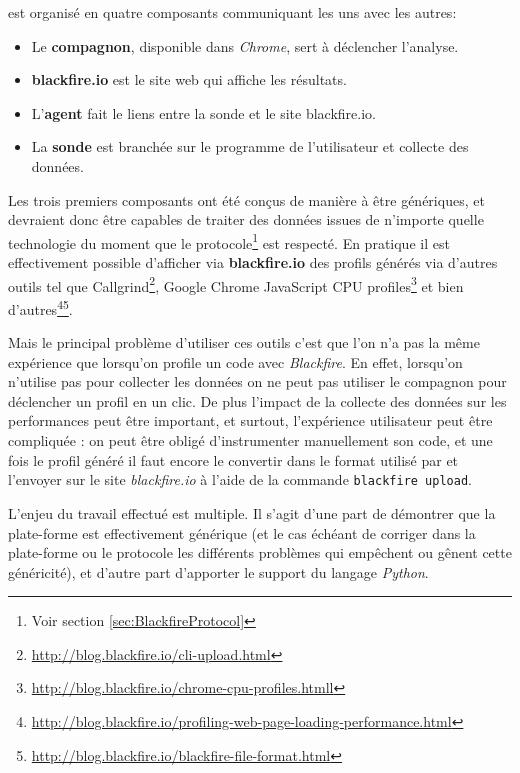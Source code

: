 \Blackfire est organisé en quatre composants communiquant les uns avec les autres:
\begin{itemize}
\item Le \textbf{compagnon}, disponible dans \emph{Chrome}, sert à déclencher l'analyse.
\item \textbf{blackfire.io} est le site web qui affiche les résultats.
\item L'\textbf{agent} fait le liens entre la sonde et le site blackfire.io.
\item La \textbf{sonde} est branchée sur le programme de l'utilisateur et collecte des données.
\end{itemize}

Les trois premiers composants ont été conçus de manière à être génériques, et devraient donc être capables de traiter des données issues de n'importe quelle technologie du moment que le protocole\footnote{Voir section \vref{sec:BlackfireProtocol}} est respecté. En pratique il est effectivement possible d'afficher via \textbf{blackfire.io} des profils générés via d'autres outils tel que Callgrind\footnote{\url{http://blog.blackfire.io/cli-upload.html}}, Google Chrome JavaScript CPU profiles\footnote{\url{http://blog.blackfire.io/chrome-cpu-profiles.htmll}} et bien d'autres\footnote{\url{http://blog.blackfire.io/profiling-web-page-loading-performance.html}}\footnote{\url{http://blog.blackfire.io/blackfire-file-format.html}}.

Mais le principal problème d'utiliser ces outils c'est que l'on n'a pas la même expérience que lorsqu'on profile un code \PHP avec \emph{Blackfire}. En effet, lorsqu'on n'utilise pas \Blackfire pour collecter les données on ne peut pas utiliser le compagnon pour déclencher un profil en un clic. De plus l'impact de la collecte des données sur les performances peut être important, et surtout, l'expérience utilisateur peut être compliquée : on peut être obligé d'instrumenter manuellement son code, et une fois le profil généré il faut encore le convertir dans le format utilisé par \Blackfire et l'envoyer sur le site \emph{blackfire.io} à l'aide de la commande \verb|blackfire upload|.

L'enjeu du travail effectué est multiple. Il s'agit d'une part de démontrer que la plate-forme \Blackfire est effectivement générique (et le cas échéant de corriger dans la plate-forme ou le protocole les différents problèmes qui empêchent ou gênent cette généricité), et d'autre part d'apporter le support du langage \emph{Python}.

